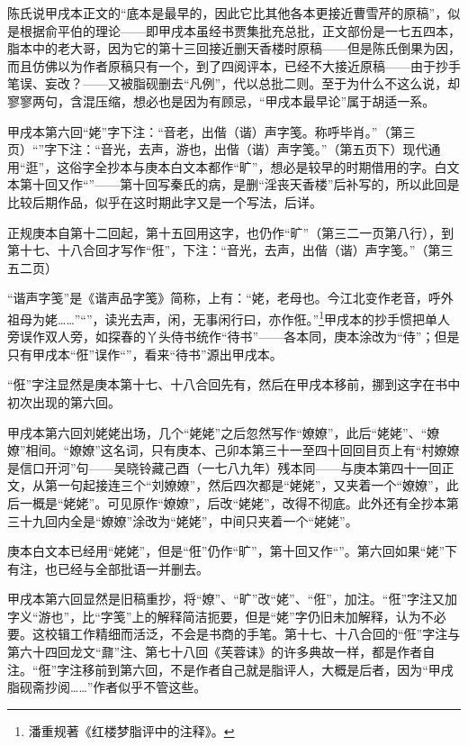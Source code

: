 \par 陈氏说甲戌本正文的“底本是最早的，因此它比其他各本更接近曹雪芹的原稿”，似是根据俞平伯的理论——即甲戌本虽经书贾集批充总批，正文部份是一七五四本，脂本中的老大哥，因为它的第十三回接近删天香楼时原稿——但是陈氏倒果为因，而且仿佛以为作者原稿只有一个，到了四阅评本，已经不大接近原稿——由于抄手笔误、妄改？——又被脂砚删去“凡例”，代以总批二则。至于为什么不这么说，却寥寥两句，含混压缩，想必也是因为有顾忌，“甲戌本最早论”属于胡适一系。
\par 甲戌本第六回“姥”字下注：“音老，出偕（谐）声字笺。称呼毕肖。”（第三页）“”字下注：“音光，去声，游也，出偕（谐）声字笺。”（第五页下）现代通用“逛”，这俗字全抄本与庚本白文本都作“旷”，想必是较早的时期借用的字。白文本第十回又作“\QuanWang ”——第十回写秦氏的病，是删“淫丧天香楼”后补写的，所以此回是比较后期作品，似乎在这时期此字又是一个写法，后详。
\par 正规庚本自第十二回起，第十五回用这字，也仍作“旷”（第三二一页第八行），到第十七、十八合回才写作“俇”，下注：“音光，去声，出偕（谐）声字笺。”（第三五二页）
\par “谐声字笺”是《谐声品字笺》简称，上有：“姥，老母也。今江北变作老音，呼外祖母为姥……”“”，读光去声，闲，无事闲行曰，亦作俇。”\footnote{潘重规著《红楼梦脂评中的注释》。}甲戌本的抄手惯把单人旁误作双人旁，如探春的丫头侍书统作“待书”——各本同，庚本涂改为“侍”；但是只有甲戌本“俇”误作“”，看来“待书”源出甲戌本。
\par “俇”字注显然是庚本第十七、十八合回先有，然后在甲戌本移前，挪到这字在书中初次出现的第六回。
\par 甲戌本第六回刘姥姥出场，几个“姥姥”之后忽然写作“嫽嫽”，此后“姥姥”、“嫽嫽”相间。“嫽嫽”这名词，只有庚本、己卯本第三十一至四十回回目页上有“村嫽嫽是信口开河”句——吴晓铃藏己酉（一七八九年）残本同——与庚本第四十一回正文，从第一句起接连三个“刘嫽嫽”，然后四次都是“姥姥”，又夹着一个“嫽嫽”，此后一概是“姥姥”。可见原作“嫽嫽”，后改“姥姥”，改得不彻底。此外还有全抄本第三十九回内全是“嫽嫽”涂改为“姥姥”，中间只夹着一个“姥姥”。
\par 庚本白文本已经用“姥姥”，但是“俇”仍作“旷”，第十回又作“\QuanWang ”。第六回如果“姥”下有注，也已经与全部批语一并删去。
\par 甲戌本第六回显然是旧稿重抄，将“嫽”、“旷”改“姥”、“俇”，加注。“俇”字注又加字义“游也”，比“字笺”上的解释简洁扼要，但是“姥”字仍旧未加解释，认为不必要。这校辑工作精细而活泛，不会是书商的手笔。第十七、十八合回的“俇”字注与第六十四回龙文“鼐”注、第七十八回《芙蓉诔》的许多典故一样，都是作者自注。“俇”字注移前到第六回，不是作者自己就是脂评人，大概是后者，因为“甲戌脂砚斋抄阅……”作者似乎不管这些。
